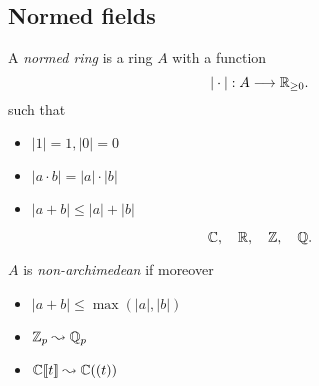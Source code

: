 \subsection{Normed fields} \label{sec:normed_fields}

\begin{frame}
	\begin{minipage}[t]{.60\textwidth}
	\begin{definition}
		A \emph{normed ring} is a ring  $A$ with a function \[ 
			|\cdot |:A  \longrightarrow \mathbb R_{\ge 0}
		.\]
	such that 
	\begin{itemize}
		\item $|1| = 1, |0| = 0$
		\item $|a \cdot b| = |a | \cdot |b|$ 
		\item $|a + b| \le |a| + |b|$
	\end{itemize}
	\end{definition}
	\end{minipage}
	\;
	\begin{minipage}[t]{.35\textwidth}
		\begin{examples}
			\[
			\mathbb C,\quad \mathbb R,\quad \mathbb Z,\quad \mathbb Q
			.\] 
		\end{examples}	
	\end{minipage}

	\medskip 
	\pause

	\begin{minipage}{.60\textwidth}
		$A$ is \emph{non-archimedean} if moreover 
	\begin{itemize}
		\item $|a + b| \le \max(|a|, |b|)$
	\end{itemize}
	\end{minipage}
	\;
	\begin{minipage}{.35\textwidth}
		\begin{examples}
			\begin{itemize}
				\item $\mathbb Z_p \leadsto \mathbb Q_p$
				\item $\mathbb C\llbracket t \rrbracket \leadsto \mathbb C((t))$
			\end{itemize}
		\end{examples}
	\end{minipage}
\end{frame}
